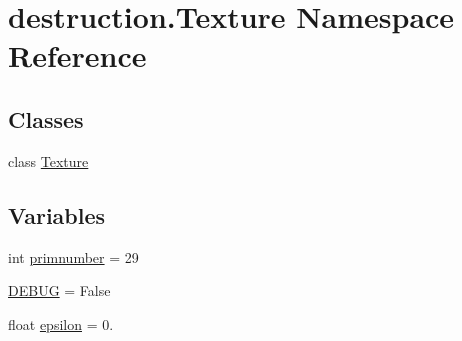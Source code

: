 \hypertarget{namespacedestruction_1_1_texture}{\section{destruction.\-Texture Namespace Reference}
\label{namespacedestruction_1_1_texture}
}
\subsection*{Classes}
\begin{DoxyCompactItemize}
\item 
class \hyperlink{classdestruction_1_1_texture_1_1_texture}{Texture}
\end{DoxyCompactItemize}
\subsection*{Variables}
\begin{DoxyCompactItemize}
\item 
int \hyperlink{namespacedestruction_1_1_texture_ad6df690c2b6c0d76f19405cf24141947}{primnumber} = 29
\item 
\hyperlink{namespacedestruction_1_1_texture_abec93f9ffc86026f00dcec533672c16a}{D\-E\-B\-U\-G} = False
\item 
float \hyperlink{namespacedestruction_1_1_texture_a1ac81f41dab2c8ba517c5bab186ce614}{epsilon} = 0.
\end{DoxyCompactItemize}


